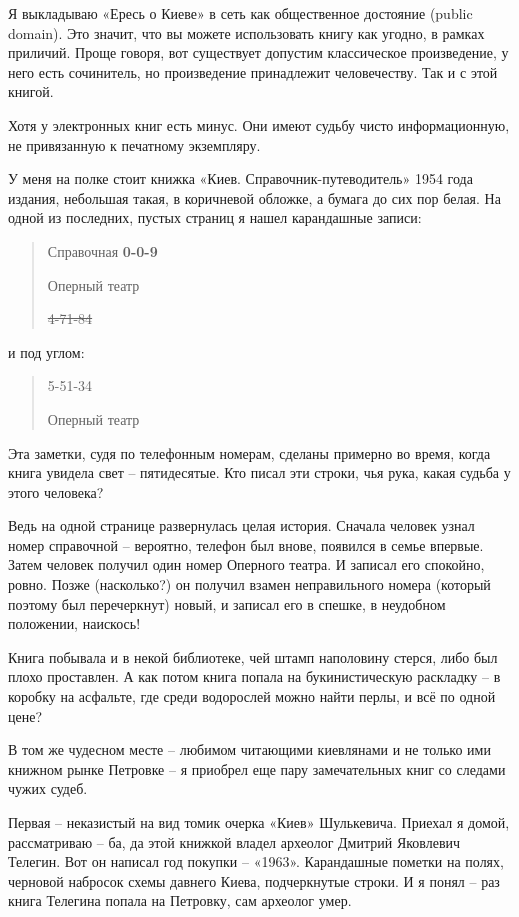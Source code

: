 Я выкладываю «Ересь о Киеве» в сеть как общественное достояние (public domain). Это значит, что вы можете использовать книгу как угодно, в рамках приличий. Проще говоря, вот существует допустим классическое произведение, у него есть сочинитель, но произведение принадлежит человечеству. Так и с этой книгой.

Хотя у электронных книг есть минус. Они имеют судьбу чисто информационную, не привязанную к печатному экземпляру.

У меня на полке стоит книжка «Киев. Справочник-пут\-еводи\-тель» 1954 года издания, небольшая такая, в коричневой обложке, а бумага до сих пор белая. На одной из последних, пустых страниц я нашел карандашные записи:

\begin{quotation}
Справочная \textbf{0-0-9}

Оперный театр

\sout{4-71-84}
\end{quotation}

и под углом:

\begin{quotation}
5-51-34

Оперный театр
\end{quotation}

Эта заметки, судя по телефонным номерам, сделаны примерно во время, когда книга увидела свет – пятидесятые. Кто писал эти строки, чья рука, какая судьба у этого человека? 

Ведь на одной странице развернулась целая история. Сначала человек узнал номер справочной – вероятно, телефон был внове, появился в семье впервые. Затем человек получил один номер Оперного театра. И записал его спокойно, ровно. Позже (насколько?) он получил взамен неправильного номера (который поэтому был перечеркнут) новый, и записал его в спешке, в неудобном положении, наискось!

Книга побывала и в некой библиотеке, чей штамп наполовину стерся, либо был плохо проставлен. А как потом книга попала на букинистическую раскладку – в коробку на асфальте, где среди водорослей можно найти перлы, и всё по одной цене?

В том же чудесном месте – любимом читающими киевлянами и не только ими книжном рынке Петровке – я приобрел еще пару замечательных книг со следами чужих судеб.

Первая – неказистый на вид томик очерка «Киев» Шулькевича. Приехал я домой, рассматриваю – ба, да  этой книжкой владел археолог Дмитрий Яковлевич Телегин. Вот он написал год покупки – «1963». Карандашные пометки на полях, черновой набросок схемы давнего Киева, подчеркнутые строки. И я понял – раз книга Телегина попала на Петровку, сам археолог умер.


